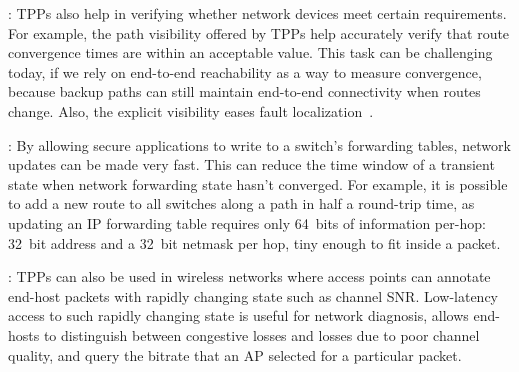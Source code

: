 


:  TPPs also help in verifying whether
network devices meet certain requirements.  For example, the path
visibility offered by TPPs help accurately verify that route
convergence times are within an acceptable value.  This task can be
challenging today, if we rely on end-to-end reachability as a way to
measure convergence, because backup paths can still maintain
end-to-end connectivity when routes change.  Also, the explicit
visibility eases fault localization~\cite{zeng2012automatic}.

:  By allowing secure applications to write
to a switch's forwarding tables, network updates can be made very
fast.  This can reduce the time window of a transient state when
network forwarding state hasn't converged.  For example, it is
possible to add a new route to all switches along a path in half a
round-trip time, as updating an IP forwarding table requires only
64~bits of information per-hop: 32~bit address and a 32~bit netmask
per hop, tiny enough to fit inside a packet.

:  TPPs can also be used in wireless
networks where access points can annotate end-host packets with
rapidly changing state such as channel SNR\@.  Low-latency access to
such rapidly changing state is useful for network diagnosis, allows
end-hosts to distinguish between congestive losses and losses due to
poor channel quality, and query the bitrate that an AP selected for a
particular packet.




\begin{comment}
\smallsec{Other possibilities.}  The above examples illustrate how simple
primitives at ASICs can enable end-hosts to coordinate and achieve a
certain behavior.  There are other possibilities; end-hosts can
implement bloom filters by hashing packets using any number of hash
functions, and increment counters inside switch memory.  Bloom
filters are useful as they form the basis of a number of measurement
tasks such as counting the number of unique IP addresses seen at a
network hop.  TPPs can also be used in wireless networks where
end-hosts can query access points for channel SNR, the number of users
contending for the channel, etc.  Having discussed examples, we now
look at the design of a TPP-enabled ASIC.
\end{comment}

